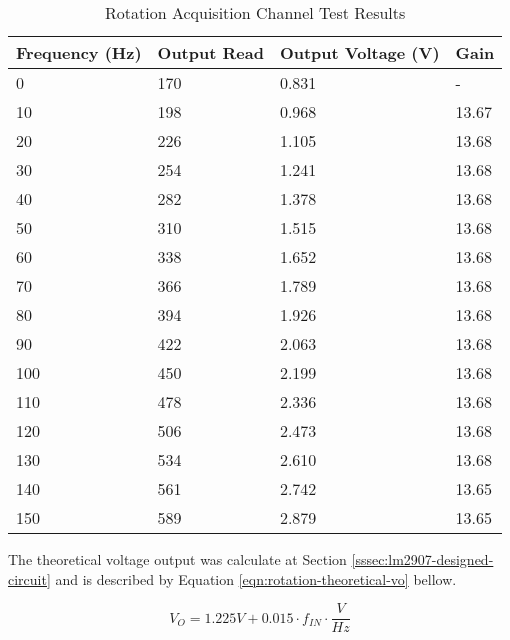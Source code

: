 			\begin{table}[h!]
				\centering
				\begin{tabular}{|l|l|l|l|}
					\hline
					\textbf{Frequency (Hz)} & \textbf{Output Read} & \textbf{Output Voltage (V)} & \textbf{Gain} \\ \hline
					0 & 170 & 0.831 & - \\ \hline
					10 & 198 & 0.968 & 13.67 \\ \hline
					20 & 226 & 1.105 & 13.68 \\ \hline
					30 & 254 & 1.241 & 13.68 \\ \hline
					40 & 282 & 1.378 & 13.68 \\ \hline
					50 & 310 & 1.515 & 13.68 \\ \hline
					60 & 338 & 1.652 & 13.68 \\ \hline
					70 & 366 & 1.789 & 13.68 \\ \hline
					80 & 394 & 1.926 & 13.68 \\ \hline
					90 & 422 & 2.063 & 13.68 \\ \hline
					100 & 450 & 2.199 & 13.68 \\ \hline
					110 & 478 & 2.336 & 13.68 \\ \hline
					120 & 506 & 2.473 & 13.68 \\ \hline
					130 & 534 & 2.610 & 13.68 \\ \hline
					140 & 561 & 2.742 & 13.65 \\ \hline
					150 & 589 & 2.879 & 13.65 \\ \hline
				\end{tabular}
				\caption{Rotation Acquisition Channel Test Results}
				\label{table:results-rotation-test}
			\end{table}

		The theoretical voltage output was calculate at Section \ref{sssec:lm2907-designed-circuit} and is described by Equation \ref{eqn:rotation-theoretical-vo} bellow.

			\begin{equation}\label{eqn:rotation-theoretical-vo}
				V_{O}=1.225V + 0.015 \cdot f_{IN}  \cdot \frac{V}{Hz}
			\end{equation}

